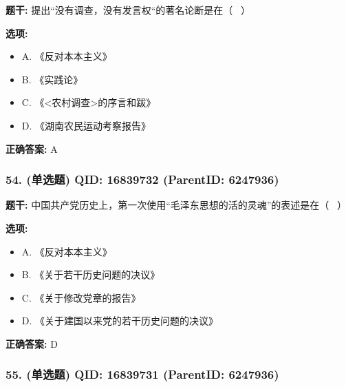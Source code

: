 \documentclass[12pt,UTF8]{ctexart}
\begin{document}
\textbf{题干:}
提出“没有调查，没有发言权“的著名论断是在（  ）



\textbf{选项:}
\begin{itemize}[leftmargin=*]

  \item A. 《反对本本主义》

  \item B. 《实践论》

  \item C. 《<农村调查>的序言和跋》

  \item D. 《湖南农民运动考察报告》

\end{itemize}

\textbf{正确答案:}
A

\vspace{0.3em}\hrulefill\vspace{0.7em}

\subsubsection*{54. (单选题) \small QID: 16839732 (ParentID: 6247936)}

\textbf{题干:}
中国共产党历史上，第一次使用“毛泽东思想的活的灵魂”的表述是在（  ）



\textbf{选项:}
\begin{itemize}[leftmargin=*]

  \item A. 《反对本本主义》

  \item B. 《关于若干历史问题的决议》

  \item C. 《关于修改党章的报告》

  \item D. 《关于建国以来党的若干历史问题的决议》

\end{itemize}

\textbf{正确答案:}
D

\vspace{0.3em}\hrulefill\vspace{0.7em}

\subsubsection*{55. (单选题) \small QID: 16839731 (ParentID: 6247936)}
\end{document}
